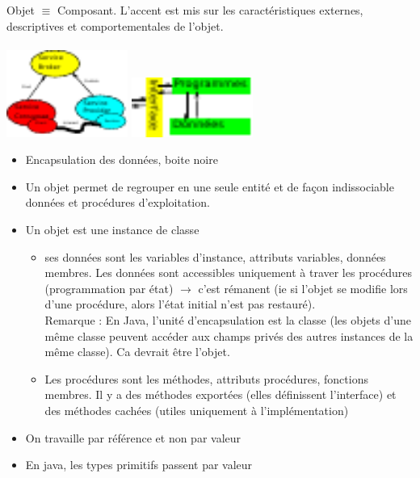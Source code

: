  Objet $\equiv$ Composant. L'accent est mis sur les caractéristiques externes, descriptives et comportementales de l'objet. \\ \\
\includegraphics[width=150px]{Images/fig2.pdf} \hspace{1cm}
\includegraphics[width=150px]{Images/fig3.pdf} \\
\begin{itemize}
	\item Encapsulation des données, boite noire
	\item Un objet permet de regrouper en une seule entité et de façon indissociable données et procédures d'exploitation.
	\item Un objet est une instance de classe 
		\begin{itemize}
			\item ses données sont les variables d'instance, attributs variables, données membres. Les données sont accessibles uniquement à traver les procédures (programmation par état) $\rightarrow$ c'est rémanent (ie si l'objet se modifie lors d'une procédure, alors l'état initial n'est pas restauré). \\
			Remarque : En Java, l'unité d'encapsulation est la classe (les objets d'une même classe peuvent accéder aux champs privés des autres instances de la même classe). Ca devrait être l'objet.
			\item Les procédures sont les méthodes, attributs procédures, fonctions membres. Il y a des méthodes exportées (elles définissent l'interface) et des méthodes cachées (utiles uniquement à l'implémentation)
		\end{itemize}
\end{itemize}

	\begin{itemize}
		\item On travaille par référence et non par valeur
		\item En java, les types primitifs passent par valeur
	\end{itemize}

